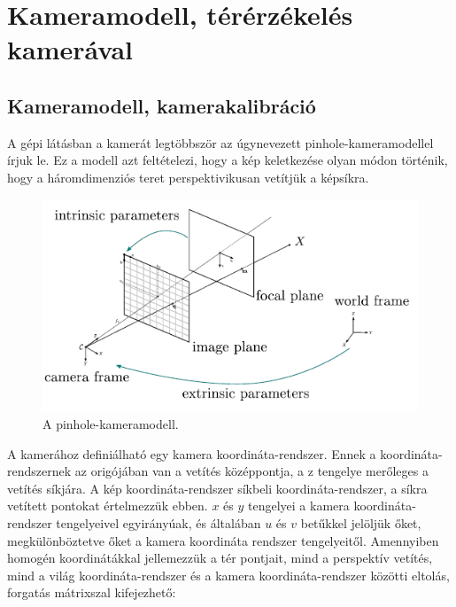 \chapter{Kameramodell, térérzékelés kamerával}
\section{Kameramodell, kamerakalibráció}
	A gépi látásban a kamerát legtöbbször az úgynevezett pinhole-kameramodellel írjuk le. Ez a modell azt feltételezi, hogy a kép keletkezése olyan módon történik, hogy a háromdimenziós teret perspektivikusan vetítjük a képsíkra.

\begin{figure}[H]
\centering
\includegraphics[width=0.7\linewidth]{chapters/camera/image3.png}
\caption{A pinhole-kameramodell.}
\label{fig:pinhole}
\end{figure}
	
	
A kamerához definiálható egy kamera koordináta-rendszer. Ennek a koordináta-rendszernek az origójában van a vetítés középpontja, a z tengelye merőleges a vetítés síkjára. A kép koordináta-rendszer síkbeli koordináta-rendszer, a síkra vetített pontokat értelmezzük ebben. $x$ és $y$ tengelyei a kamera koordináta-rendszer tengelyeivel egyirányúak, és általában $u$ és $v$ betűkkel jelöljük őket, megkülönböztetve őket a kamera koordináta rendszer tengelyeitől. Amennyiben homogén koordinátákkal jellemezzük a tér pontjait, mind a perspektív vetítés, mind a világ koordináta-rendszer és a kamera koordináta-rendszer közötti eltolás, forgatás mátrixszal kifejezhető: 

